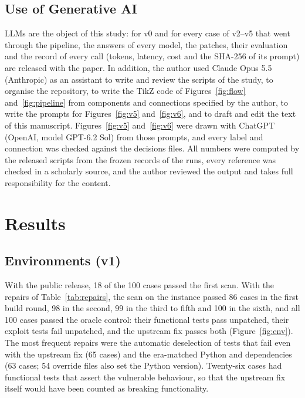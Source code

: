 \documentclass[ai,article,submit,oneauthor]{Definitions/mdpi}
\begin{document}
\subsection{Use of Generative AI}\label{sec:ai}

LLMs are the object of this study: for v0 and for every case of v2--v5 that went through the pipeline, the answers of every model, the patches, their evaluation and the record of every call (tokens, latency, cost and the SHA-256 of its prompt) are released with the paper. In addition, the author used Claude Opus 5.5 (Anthropic) as an assistant to write and review the scripts of the study, to organise the repository, to write the TikZ code of Figures~\ref{fig:flow} and~\ref{fig:pipeline} from components and connections specified by the author, to write the prompts for Figures~\ref{fig:v5} and~\ref{fig:v6}, and to draft and edit the text of this manuscript. Figures~\ref{fig:v5} and~\ref{fig:v6} were drawn with ChatGPT (OpenAI, model GPT-6.2 Sol) from those prompts, and every label and connection was checked against the decisions files. All numbers were computed by the released scripts from the frozen records of the runs, every reference was checked in a scholarly source, and the author reviewed the output and takes full responsibility for the content.

\section{Results}\label{sec:results}

\subsection{Environments (v1)}\label{sec:resenv}

With the public release, 18 of the 100 cases passed the first scan. With the repairs of Table~\ref{tab:repairs}, the scan on the instance passed 86 cases in the first build round, 98 in the second, 99 in the third to fifth and 100 in the sixth, and all 100 cases passed the oracle control: their functional tests pass unpatched, their exploit tests fail unpatched, and the upstream fix passes both (Figure~\ref{fig:env}). The most frequent repairs were the automatic deselection of tests that fail even with the upstream fix (65 cases) and the era-matched Python and dependencies (63 cases; 54 override files also set the Python version). Twenty-six cases had functional tests that assert the vulnerable behaviour, so that the upstream fix itself would have been counted as breaking functionality.
\end{document}
